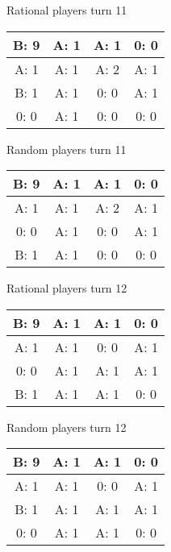 \documentclass[12pt]{article}
\begin{document}
Rational players turn 11
\begin{center}
\begin{tabular}{|c|c|c|c|}
\hline
B: 9  & A: 1  & A: 1  & 0: 0  \\ \hline
A: 1  & A: 1  & A: 2  & A: 1  \\ \hline
B: 1  & A: 1  & 0: 0  & A: 1  \\ \hline
0: 0  & A: 1  & 0: 0  & 0: 0  \\ \hline
\end{tabular}
\end{center}
Random players turn 11
\begin{center}
\begin{tabular}{|c|c|c|c|}
\hline
B: 9  & A: 1  & A: 1  & 0: 0  \\ \hline
A: 1  & A: 1  & A: 2  & A: 1  \\ \hline
0: 0  & A: 1  & 0: 0  & A: 1  \\ \hline
B: 1  & A: 1  & 0: 0  & 0: 0  \\ \hline
\end{tabular}
\end{center}

Rational players turn 12
\begin{center}
\begin{tabular}{|c|c|c|c|}
\hline
B: 9  & A: 1  & A: 1  & 0: 0  \\ \hline
A: 1  & A: 1  & 0: 0  & A: 1  \\ \hline
0: 0  & A: 1  & A: 1  & A: 1  \\ \hline
B: 1  & A: 1  & A: 1  & 0: 0  \\ \hline
\end{tabular}
\end{center}
Random players turn 12
\begin{center}
\begin{tabular}{|c|c|c|c|}
\hline
B: 9  & A: 1  & A: 1  & 0: 0  \\ \hline
A: 1  & A: 1  & 0: 0  & A: 1  \\ \hline
B: 1  & A: 1  & A: 1  & A: 1  \\ \hline
0: 0  & A: 1  & A: 1  & 0: 0  \\ \hline
\end{tabular}
\end{center}
\end{document}
